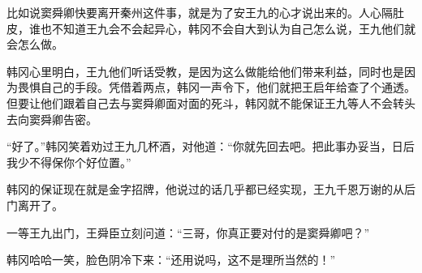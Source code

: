 比如说窦舜卿快要离开秦州这件事，就是为了安王九的心才说出来的。人心隔肚皮，谁也不知道王九会不会起异心，韩冈不会自大到认为自己怎么说，王九他们就会怎么做。

韩冈心里明白，王九他们听话受教，是因为这么做能给他们带来利益，同时也是因为畏惧自己的手段。凭借着两点，韩冈一声令下，他们就把王启年给查了个通透。但要让他们跟着自己去与窦舜卿面对面的死斗，韩冈就不能保证王九等人不会转头去向窦舜卿告密。

“好了。”韩冈笑着劝过王九几杯酒，对他道：“你就先回去吧。把此事办妥当，日后我少不得保你个好位置。”

韩冈的保证现在就是金字招牌，他说过的话几乎都已经实现，王九千恩万谢的从后门离开了。

一等王九出门，王舜臣立刻问道：“三哥，你真正要对付的是窦舜卿吧？”

韩冈哈哈一笑，脸色阴冷下来：“还用说吗，这不是理所当然的！”

